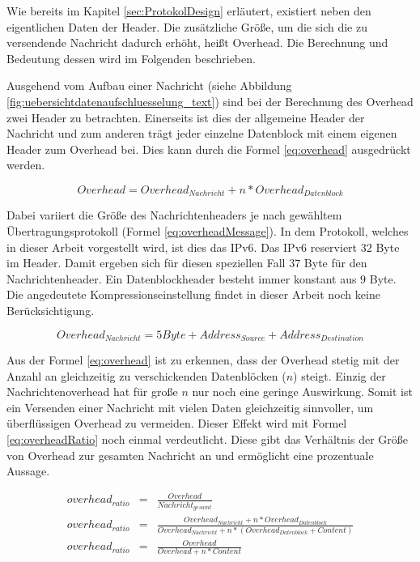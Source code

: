 Wie bereits im Kapitel \ref{sec:ProtokolDesign} erläutert, existiert neben den
eigentlichen Daten der Header. Die zusätzliche Größe, um die sich die
zu versendende Nachricht dadurch erhöht, heißt Overhead. Die Berechnung und
Bedeutung dessen wird im Folgenden beschrieben.

Ausgehend vom Aufbau einer Nachricht (siehe Abbildung
\ref{fig:uebersichtdatenaufschluesselung_text}) sind bei der Berechnung des
Overhead zwei Header zu betrachten. Einerseits ist dies der allgemeine Header der
Nachricht und zum anderen trägt jeder einzelne Datenblock
mit einem eigenen Header zum Overhead bei. Dies kann durch die Formel
\ref{eq:overhead} ausgedrückt werden.

\begin{equation}
	Overhead = Overhead_{Nachricht} + n * Overhead_{Datenblock}
	\label{eq:overhead}
\end{equation}

Dabei variiert die Größe des Nachrichtenheaders je nach gewähltem
Übertragungsprotokoll (Formel \ref{eq:overheadMessage}). In dem Protokoll,
welches in dieser Arbeit vorgestellt wird, ist dies das IPv6. Das IPv6
reserviert $32$ Byte im Header. Damit ergeben sich für diesen speziellen
Fall $37$ Byte für den Nachrichtenheader. Ein Datenblockheader besteht immer konstant aus $9$ Byte.
Die angedeutete Kompressionseinstellung findet in dieser Arbeit noch
keine Berücksichtigung.

\begin{equation}
	Overhead_{Nachricht} = 5 Byte + Address_{Source} + Address_{Destination}
	\label{eq:overheadMessage}
\end{equation}

Aus der Formel \ref{eq:overhead} ist zu erkennen, dass der Overhead
stetig mit der Anzahl an gleichzeitig zu verschickenden Datenblöcken ($n$)
steigt. Einzig der Nachrichtenoverhead hat für große $n$ nur noch eine
geringe Auswirkung. Somit ist ein Versenden einer Nachricht mit vielen Daten
gleichzeitig sinnvoller, um überflüssigen Overhead zu vermeiden. Dieser
Effekt wird mit Formel \ref{eq:overheadRatio} noch einmal verdeutlicht. Diese
gibt das Verhältnis der Größe von Overhead zur gesamten Nachricht an und
ermöglicht eine prozentuale Aussage.

\begin{eqnarray} 
	overhead_{ratio} & = & \frac{Overhead}{Nachricht_{gesamt}}\\
	overhead_{ratio} & = & \frac{Overhead_{Nachricht} + n * Overhead_{Datenblock}}{Overhead_{Nachricht} + n * (Overhead_{Datenblock} + Content)}\\
	overhead_{ratio} & = & \frac{Overhead}{Overhead + n * Content}
	\label{eq:overheadRatio}
\end{eqnarray}

